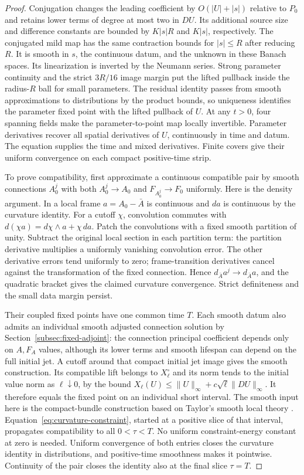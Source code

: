\documentclass[11pt]{article}
\numberwithin{equation}{section}
\theoremstyle{definition}
\theoremstyle{remark}
\begin{document}
\begin{proof}
Conjugation changes the leading coefficient by $O(|U|+|s|)$
relative to $P_0$ and retains lower terms of degree at most two
in $DU$. Its additional source size and difference constants
are bounded by $K|s|R$ and $K|s|$, respectively.
The conjugated mild map has the same contraction bounds for
$|s|\le R$ after reducing $R$. It is smooth in
$s$, the continuous datum, and the unknown in these Banach
spaces. Its linearization is inverted by the Neumann series.
Strong parameter continuity and the strict $3R/16$ image
margin put the lifted pullback inside the radius-$R$ ball
for small parameters. The residual identity passes from smooth approximations to
distributions by the product bounds, so uniqueness identifies
the parameter fixed point with the lifted pullback of $U$.
At any $t>0$, four spanning fields make the parameter-to-point
map locally invertible. Parameter derivatives recover all
spatial derivatives of $U$, continuously in time and datum.
The equation supplies the time and mixed derivatives.
Finite covers give their uniform convergence on each compact
positive-time strip.

To prove compatibility, first approximate a continuous
compatible pair by smooth connections $A_0^j$ with both
$A_0^j\to A_0$ and $F_{A_0^j}\to F_0$ uniformly.
Here is the density argument. In a local frame $a=A_0-\bar A$
is continuous and $da$ is continuous by the curvature identity.
For a cutoff $\chi$, convolution commutes with
$d(\chi a)=d\chi\wedge a+\chi\,da$.
Patch the convolutions with a fixed smooth partition of unity.
Subtract the original local section in each partition term:
the partition derivative multiplies a uniformly vanishing
convolution error. The other derivative errors tend uniformly
to zero; frame-transition
derivatives cancel against the transformation of the fixed
connection. Hence $d_{\bar A}a^j\to d_{\bar A}a$, and the
quadratic bracket gives the claimed curvature convergence.
Strict definiteness and the small data margin persist.

Their coupled fixed points have one common time $T$.
Each smooth datum also admits an individual smooth adjusted
connection solution by Section~\ref{subsec:fixed-adjoint}:
the connection principal coefficient depends only on $A,F_A$
values, although its lower terms and smooth lifespan can
depend on the full initial jet. A cutoff around that compact
initial jet image gives the smooth construction. Its compatible
lift belongs to $X_\ell^\circ$ and its norm tends to the
initial value norm as $\ell\downarrow0$, by the bound
$X_\ell(U)\le\|U\|_\infty+c\sqrt\ell\|DU\|_\infty$.
It therefore equals the fixed point on an individual short
interval. The smooth input here is the compact-bundle
construction based on Taylor's smooth local theory
\cite[Section 7.3 of the inspected text]{Taylor1991Nonlinear}.
Equation~\eqref{eq:curvature-constraint}, started at a positive
slice of that interval, propagates compatibility to all
$0<\tau<T$. No uniform constraint-energy constant at zero is
needed. Uniform convergence of both entries closes the
curvature identity in distributions, and positive-time
smoothness makes it pointwise. Continuity of the pair closes
the identity also at the final slice $\tau=T$.
\end{proof}
\end{document}
